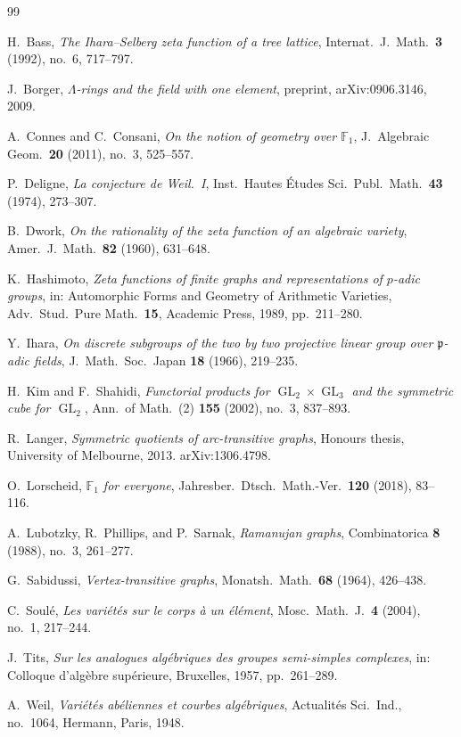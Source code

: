\documentclass[11pt,a4paper]{article}
\theoremstyle{plain}
\theoremstyle{definition}
\newcommand{\F}{\mathbb{F}}
\newcommand{\GL}{\operatorname{GL}}
\begin{document}
\begin{thebibliography}{99}

H.~Bass,
\emph{The Ihara--Selberg zeta function of a tree lattice},
Internat.\ J.\ Math.\ \textbf{3} (1992), no.~6, 717--797.

J.~Borger,
\emph{$\Lambda$-rings and the field with one element},
preprint, arXiv:0906.3146, 2009.

A.~Connes and C.~Consani,
\emph{On the notion of geometry over $\F_1$},
J.\ Algebraic Geom.\ \textbf{20} (2011), no.~3, 525--557.

P.~Deligne,
\emph{La conjecture de Weil.\ I},
Inst.\ Hautes \'Etudes Sci.\ Publ.\ Math.\ \textbf{43} (1974), 273--307.

B.~Dwork,
\emph{On the rationality of the zeta function of an algebraic variety},
Amer.\ J.\ Math.\ \textbf{82} (1960), 631--648.

K.~Hashimoto,
\emph{Zeta functions of finite graphs and representations of $p$-adic groups},
in: Automorphic Forms and Geometry of Arithmetic Varieties,
Adv.\ Stud.\ Pure Math.\ \textbf{15}, Academic Press, 1989, pp.~211--280.

Y.~Ihara,
\emph{On discrete subgroups of the two by two projective linear group over
$\mathfrak{p}$-adic fields},
J.\ Math.\ Soc.\ Japan \textbf{18} (1966), 219--235.

H.~Kim and F.~Shahidi,
\emph{Functorial products for $\GL_2 \times \GL_3$ and the symmetric cube
for $\GL_2$},
Ann.\ of Math.\ (2) \textbf{155} (2002), no.~3, 837--893.

R.~Langer,
\emph{Symmetric quotients of arc-transitive graphs},
Honours thesis, University of Melbourne, 2013.
arXiv:1306.4798.

O.~Lorscheid,
\emph{$\F_1$ for everyone},
Jahresber.\ Dtsch.\ Math.-Ver.\ \textbf{120} (2018), 83--116.

A.~Lubotzky, R.~Phillips, and P.~Sarnak,
\emph{Ramanujan graphs},
Combinatorica \textbf{8} (1988), no.~3, 261--277.

G.~Sabidussi,
\emph{Vertex-transitive graphs},
Monatsh.\ Math.\ \textbf{68} (1964), 426--438.

C.~Soul\'e,
\emph{Les vari\'et\'es sur le corps \`a un \'el\'ement},
Mosc.\ Math.\ J.\ \textbf{4} (2004), no.~1, 217--244.

J.~Tits,
\emph{Sur les analogues alg\'ebriques des groupes semi-simples complexes},
in: Colloque d'alg\`ebre sup\'erieure, Bruxelles, 1957, pp.~261--289.

A.~Weil,
\emph{Vari\'et\'es ab\'eliennes et courbes alg\'ebriques},
Actualit\'es Sci.\ Ind., no.~1064, Hermann, Paris, 1948.

\end{thebibliography}
\end{document}
